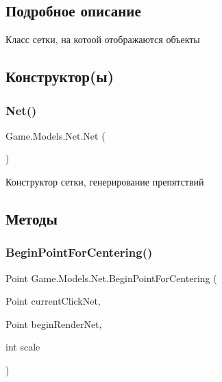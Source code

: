 \subsection{Подробное описание}
Класс сетки, на котоой отображаются объекты 



\subsection{Конструктор(ы)}
\mbox{\label{class_game_1_1_models_1_1_net_aa67c03c5f8ad53e819b0b5c2ee6178bd}} 
\subsubsection{\texorpdfstring{Net()}{Net()}}
{\footnotesize\ttfamily Game.\+Models.\+Net.\+Net (\begin{DoxyParamCaption}{ }\end{DoxyParamCaption})}



Конструктор сетки, генерирование препятствий 



\subsection{Методы}
\mbox{\label{class_game_1_1_models_1_1_net_a8c05bb4cd220b4b8919cc03a48656181}} 
\subsubsection{\texorpdfstring{Begin\+Point\+For\+Centering()}{BeginPointForCentering()}}
{\footnotesize\ttfamily Point Game.\+Models.\+Net.\+Begin\+Point\+For\+Centering (\begin{DoxyParamCaption}\item[{Point}]{current\+Click\+Net,  }\item[{Point}]{begin\+Render\+Net,  }\item[{int}]{scale }\end{DoxyParamCaption})}



